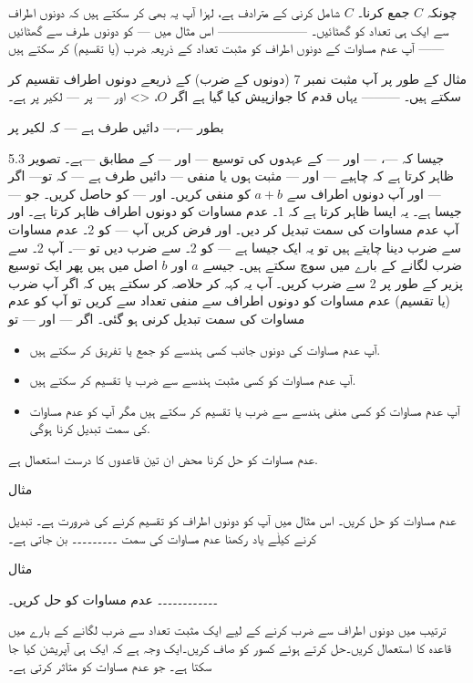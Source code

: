 چونکہ \(C\)  جمع کرنا۔ \(C\) شامل کرنی کے مترادف ہے، لہزا آپ یہ بھی کر سکتے ہیں کہ دونوں اطراف سے ایک ہی تعداد کو گھٹائیں۔
---------------------
اس مثال میں --- کو دونوں طرف سے گھٹائیں
------
آپ عدم مساوات کے دونوں اطراف کو مثبت تعداد کے ذریعہ ضرب (یا تقسیم) کر سکتے ہیں

مثال کے طور پر آپ مثبت نمبر 7 (دونوں کے ضرب) کے ذریعے دونوں اطراف تقسیم کر سکتے ہیں۔ 
---------
یہاں قدم کا جوازپیش کیا گیا ہے اگر \(O\)، <> اور --- پر --- لکیر پر ہے۔

بطور ---،--- دائیں طرف ہے --- کہ لکیر پر

جیسا کہ ---، --- اور --- کے عہدوں کی توسیع --- اور --- کے مطابق ---ہے۔
تصویر 5.3 ظاہر کرتا ہے کہ چاہیے --- اور --- مثبت ہوں یا منفی --- دائیں طرف ہے --- کہ تو---
اگر --- اور آپ دونوں اطراف سے \(a+b\) کو منفی کریں۔  اور --- کو حاصل کریں۔ جو --- جیسا ہے۔ یہ ایسا ظاہر کرتا ہے کہ 1۔ عدم مساوات کو دونوں اطراف ظاہر کرتا ہے۔ اور آپ عدم مساوات کی سمت تبدیل کر دیں۔ اور فرض کریں آپ --- کو 2۔ عدم مساوات سے ضرب دینا چایتے ہیں تو یہ ایک جیسا ہے --- کو 2۔ سے ضرب دیں تو ---۔
آپ 2۔ سے ضرب لگانے کے بارے میں سوچ سکتے ہیں۔ جیسے \(a\) اور \(b\) اصل میں ہیں پھر ایک توسیع پزیر کے طور پر 2 سے ضرب کریں۔
آپ  یہ کہہ کر حلاصہ کر سکتے ہیں کہ اگر آپ ضرب (یا تقسیم) عدم مساوات کو دونوں اطراف سے منفی تعداد سے کریں تو آپ کو عدم مساوات کی سمت تبدیل کرنی ہو گئی۔ اگر --- اور --- تو 

\begin{itemize}
\item
آپ عدم مساوات کی دونوں جانب کسی ہندسے کو جمع یا تفریق کر سکتے ہیں.
\item
آپ عدم مساوات کو کسی مثبت ہندسے سے ضرب یا تقسیم کر سکتے ہیں. 
\item
آپ عدم مساوات کو کسی منفی ہندسے سے ضرب یا تقسیم کر سکتے ہیں مگر آپ کو عدم مساوات کی سمت تبدیل کرنا ہوگی. 
\end{itemize}
عدم مساوات کو حل کرنا محض ان تین قاعدوں کا درست استعمال ہے.

مثال

 عدم مساوات کو حل کریں۔
 اس مثال میں آپ کو دونوں اطراف کو تقسیم کرنے کی ضرورت ہے۔ تبدیل کرنے کیلٰے یاد رکھنا عدم مساوات کی سمت ۔۔۔۔۔۔۔۔۔ بن جاتی ہے۔
 
 مثال 
 
 ۔۔۔۔۔۔۔۔۔۔۔۔ عدم مساوات کو حل کریں۔
 

ترتیب میں دونوں اطراف سے ضرب کرنے کے لیے ایک مثبت تعداد سے ضرب لگانے کے بارے میں قاعدہ کا استعمال کریں۔حل کرتے ہوئے کسور کو صاف کریں۔ایک وجہ ہے کہ ایک ہی آپریشن کیا جا سکتا ہے۔ جو عدم مساوات کو متاثر کرتی ہے۔

